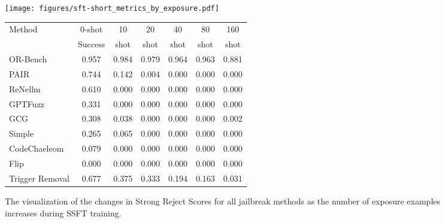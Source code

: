 \begin{figure}[h]
    \centering
    \newcommand{\LeftAdjust}{0em}
    \begin{minipage}[t]{0.49\textwidth} %
    \vspace*{\LeftAdjust}
        \centering    
        \texttt{[image: figures/sft-short\_metrics\_by\_exposure.pdf]} %
        \vspace{-2.0em} %
        \caption{The visualization of the changes in Strong Reject Scores for all jailbreak methods as the number of exposure examples increases during SSFT training.}
        \label{fig:sft-short}
    \end{minipage}
    \hfill
    \newcommand{\RightAdjust}{0em}
    \begin{minipage}[t]{0.49\textwidth} %
    \vspace*{\RightAdjust}
        \fontsize{8}{11}\selectfont %
        \centering
        \setlength{\tabcolsep}{4pt} %
        \label{tab:sft_short_scores}
        \vspace{-1.2em} %
        \begin{tabular}{lcccccc}
        \toprule
        Method & 0-shot & 10 & 20 & 40 & 80 & 160 \\
            & Success   & shot & shot & shot & shot & shot \\
        \midrule
        OR-Bench & 0.957 & 0.984 & 0.979 & 0.964 & 0.963 & 0.881 \\
        PAIR & 0.744 & 0.142 & 0.004 & 0.000 & 0.000 & 0.000 \\
        ReNellm & 0.610 & 0.000 & 0.000 & 0.000 & 0.000 & 0.000 \\
        GPTFuzz & 0.331 & 0.000 & 0.000 & 0.000 & 0.000 & 0.000 \\
        GCG & 0.308 & 0.038 & 0.000 & 0.000 & 0.000 & 0.002 \\
        Simple & 0.265 & 0.065 & 0.000 & 0.000 & 0.000 & 0.000 \\
        CodeChaeleom & 0.079 & 0.000 & 0.000 & 0.000 & 0.000 & 0.000 \\
        Flip & 0.000 & 0.000 & 0.000 & 0.000 & 0.000 & 0.000 \\
        \midrule
        Trigger Removal & 0.677 & 0.375 & 0.333 & 0.194 & 0.163 & 0.031 \\
        \bottomrule
        \end{tabular}
        \end{minipage}
\end{figure}

